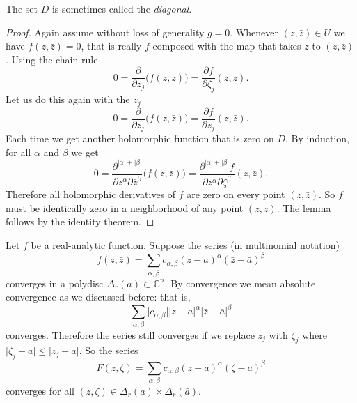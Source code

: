 \documentclass[12pt,openany]{book}
\newcommand{\sabs}[1]{\lvert {#1} \rvert}
\newcommand{\C}{{\mathbb{C}}}
\newcommand{\myindex}[1]{#1\index{#1}}
\theoremstyle{plain}
\theoremstyle{remark}
\theoremstyle{definition}
\theoremstyle{exercise}
\theoremstyle{example}
\begin{document}
The set $D$ is sometimes called the \emph{\myindex{diagonal}}.

\begin{proof}
Again assume without loss of generality $g=0$.
Whenever $(z,\bar{z}) \in U$ we have $f(z,\bar{z}) = 0$, that is really
$f$ composed with the map that takes $z$ to $(z,\bar{z})$.  Using the chain rule
\begin{equation*}
0 =
\frac{\partial}{\partial \bar{z}_j} \bigl(f(z,\bar{z})\bigr)
=
\frac{\partial f}{\partial \zeta_j}(z,\bar{z}) .
\end{equation*}
Let us do this again with the $z_j$
\begin{equation*}
0 =
\frac{\partial}{\partial z_j} \bigl(f(z,\bar{z})\bigr)
=
\frac{\partial f}{\partial z_j}(z,\bar{z}) .
\end{equation*}
Each time we get another holomorphic function that is zero on $D$.
By induction, for all $\alpha$ and $\beta$ we get
\begin{equation*}
0 =
\frac{\partial^{\sabs{\alpha}+\sabs{\beta}}}{\partial z^\alpha \partial \bar{z}^\beta} \bigl(f(z,\bar{z})\bigr)
=
\frac{\partial^{\sabs{\alpha}+\sabs{\beta}} f}{\partial z^\alpha \partial
\zeta^\beta}(z,\bar{z}) .
\end{equation*}
Therefore all holomorphic derivatives of $f$ are zero on every point
$(z,\bar{z})$.  So $f$ must be identically zero in a neighborhood of any
point $(z,\bar{z})$.  The lemma follows by the identity
theorem.
\end{proof}

Let $f$ be a real-analytic function.  Suppose 
the series (in multinomial notation)
\begin{equation*}
f(z,\bar{z}) =
\sum_{\alpha,\beta} c_{\alpha,\beta} {(z-a)}^\alpha
{(\bar{z}-\bar{a})}^\beta
\end{equation*}
converges in a polydisc $\Delta_r(a) \subset \C^n$.
By convergence we mean absolute
convergence as we discussed before: that is,
\begin{equation*}
\sum_{\alpha,\beta} \sabs{c_{\alpha,\beta}} \sabs{z-a}^\alpha
\sabs{\bar{z}-\bar{a}}^\beta
\end{equation*}
converges.
Therefore the series still converges if we replace $\bar{z}_j$  with
$\zeta_j$ where $\sabs{\zeta_j-\bar{a}} \leq \sabs{\bar{z}_j-\bar{a}}$.
So the series
\begin{equation*}
F(z,\zeta) =
\sum_{\alpha,\beta} c_{\alpha,\beta} {(z-a)}^\alpha
{(\zeta-\bar{a})}^\beta
\end{equation*}
converges for all $(z,\zeta) \in \Delta_r(a) \times \Delta_r(\bar{a})$.
\end{document}
